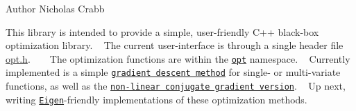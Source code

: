 \begin{DoxyAuthor}{Author}
Nicholas Crabb
\end{DoxyAuthor}
This library is intended to provide a simple, user-\/friendly C++ black-\/box optimization library. ~\newline
 The current user-\/interface is through a single header file \mbox{\hyperlink{opt_8h_source}{opt.\+h}}. ~\newline
 ~\newline
 The optimization functions are within the \href{https://charelstoncrabb.github.io/basic_opt/html/namespaceopt.html}{\tt opt} namespace. ~\newline
 Currently implemented is a simple \href{https://en.wikipedia.org/wiki/Gradient_descent}{\tt gradient descent method} for single-\/ or multi-\/variate functions, as well as the \href{https://en.wikipedia.org/wiki/Nonlinear_conjugate_gradient_method}{\tt non-\/linear conjugate gradient version}. ~\newline
 Up next, writing \href{http://eigen.tuxfamily.org/index.php?title=Main_Page}{\tt Eigen}-\/friendly implementations of these optimization methods. 